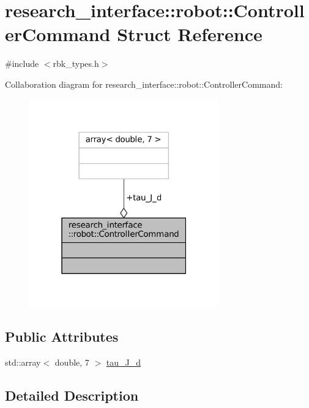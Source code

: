 \hypertarget{structresearch__interface_1_1robot_1_1ControllerCommand}{}\section{research\+\_\+interface\+:\+:robot\+:\+:Controller\+Command Struct Reference}
\label{structresearch__interface_1_1robot_1_1ControllerCommand}


{\ttfamily \#include $<$rbk\+\_\+types.\+h$>$}



Collaboration diagram for research\+\_\+interface\+:\+:robot\+:\+:Controller\+Command\+:
\nopagebreak
\begin{figure}[H]
\begin{center}
\leavevmode
\includegraphics[width=232pt]{structresearch__interface_1_1robot_1_1ControllerCommand__coll__graph}
\end{center}
\end{figure}
\subsection*{Public Attributes}
\begin{DoxyCompactItemize}
\item 
std\+::array$<$ double, 7 $>$ \hyperlink{structresearch__interface_1_1robot_1_1ControllerCommand_a55f1abde5337f7ba6f170c8b7d8f89aa}{tau\+\_\+\+J\+\_\+d}
\end{DoxyCompactItemize}


\subsection{Detailed Description}


